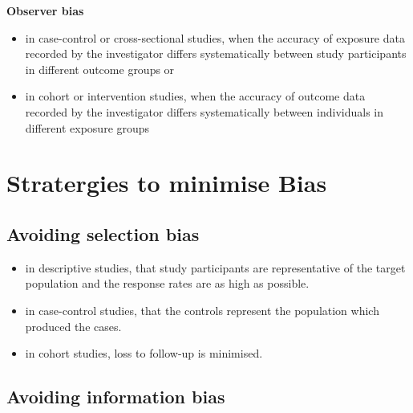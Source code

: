 \documentclass[
  letterpaper,
  DIV=11,
  numbers=noendperiod]{scrreprt}
\begin{document}
\textbf{Observer bias}

\begin{itemize}
\item
  in case-control or cross-sectional studies, when the accuracy of
  exposure data recorded by the investigator differs systematically
  between study participants in different outcome groups or
\item
  in cohort or intervention studies, when the accuracy of outcome data
  recorded by the investigator differs systematically between
  individuals in different exposure groups
\end{itemize}

\hypertarget{stratergies-to-minimise-bias}{%
\section{Stratergies to minimise
Bias}\label{stratergies-to-minimise-bias}}

\hypertarget{avoiding-selection-bias}{%
\subsection{Avoiding selection bias}\label{avoiding-selection-bias}}

\begin{itemize}
\item
  in descriptive studies, that study participants are representative of
  the target population and the response rates are as high as possible.
\item
  in case-control studies, that the controls represent the population
  which produced the cases.
\item
  in cohort studies, loss to follow-up is minimised.
\end{itemize}

\hypertarget{avoiding-information-bias}{%
\subsection{Avoiding information bias}\label{avoiding-information-bias}}
\end{document}
